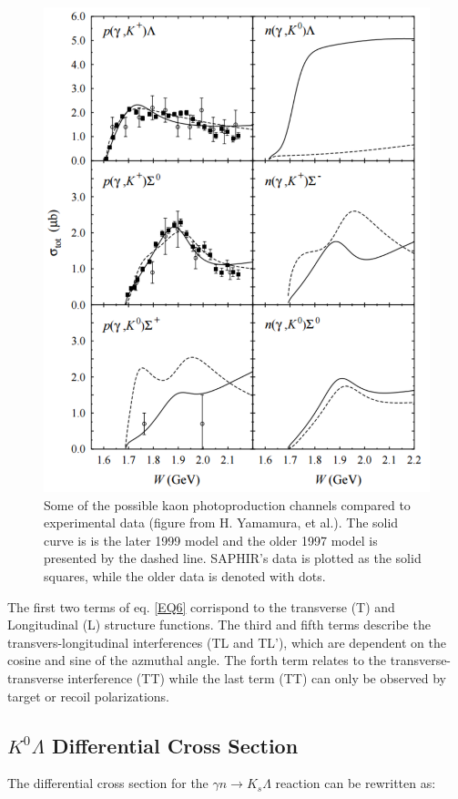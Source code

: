 \documentclass[prb,10pt,twocolumn,tightenlines,superscriptaddress]{revtex4-1}
\begin{document}
\begin{figure}[t]
    \centering
      \includegraphics[width=\linewidth]{theoryResonance}
    \caption{Some of the possible kaon photoproduction channels compared to  experimental data (figure from H. Yamamura, et al.\cite{bib:model1}). The solid curve is is the later 1999 model and the older 1997 model is presented by the dashed line\cite{bib:model2}. SAPHIR’s data is plotted as the solid squares, while the older data is denoted with dots.}
        \label{fig:theoryResonance}%
\end{figure}

The first two terms of eq. \ref{EQ6} corrispond to the transverse (T) and Longitudinal (L) structure functions. The third and fifth terms describe the transvers-longitudinal interferences (TL and TL'), which are dependent on the cosine and sine of the azmuthal angle.  The forth term relates to the transverse-transverse interference (TT) while the last term (TT) can only be observed by target or recoil polarizations. 

\subsection{$K^{0}\Lambda$ Differential Cross Section} \label{sec:diffcross}
The differential cross section for the $\gamma n \rightarrow K_{s}\Lambda$ reaction can be rewritten as: 
\end{document}
